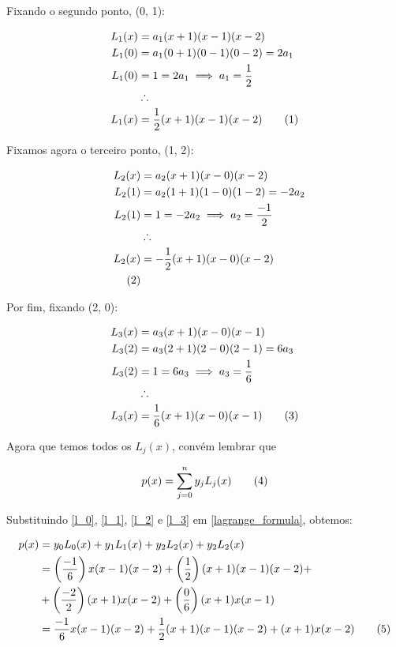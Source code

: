 \documentclass[9.5pt,reqno,a4paper]{amsart}
\newcommand\numberthis{\addtocounter{equation}{1}\tag{\theequation}}
\begin{document}
\bigskip
\bigskip
Fixando o segundo ponto, (0, 1):

\begin{align*}
    L_1(x) &= a_1(x+1)(x-1)(x-2)\\
    L_1(0) &= a_1(0+1)(0-1)(0-2) = 2a_1\\
    L_1(0) &= 1 = 2a_1 \implies a_1 = \frac{1}{2}\\
    &\therefore\\
    L_1(x) &= \frac{1}{2}(x+1)(x-1)(x-2) \numberthis \label{l_1}
\end{align*}

\bigskip
\bigskip
Fixamos agora o terceiro ponto, (1, 2):

\begin{align*}
    L_2(x) &= a_2(x+1)(x-0)(x-2)\\
    L_2(1) &= a_2(1+1)(1-0)(1-2) = -2a_2\\
    L_2(1) &= 1 = -2a_2 \implies a_2 = \frac{-1}{2}\\
    &\therefore\\
    L_2(x) &= -\frac{1}{2}(x+1)(x-0)(x-2)\\ \numberthis \label{l_2}
\end{align*}

\bigskip
\bigskip
Por fim, fixando (2, 0):

\begin{align*}
    L_3(x) &= a_3(x+1)(x-0)(x-1)\\
    L_3(2) &= a_3(2+1)(2-0)(2-1) = 6a_3\\
    L_3(2) &= 1 = 6a_3 \implies a_3 = \frac{1}{6}\\
    &\therefore\\
    L_3(x) &= \frac{1}{6}(x+1)(x-0)(x-1) \numberthis \label{l_3}
\end{align*}

\bigskip
\bigskip
Agora que temos todos os $L_j(x)$, convém lembrar que

\begin{equation}
    p(x) = \sum_{j=0}^{n} y_j L_j(x) \numberthis \label{lagrange_formula}
\end{equation}

\bigskip
\bigskip
Substituindo \eqref{l_0}, \eqref{l_1}, \eqref{l_2} e \eqref{l_3} em \eqref{lagrange_formula}, obtemos:

\begin{align*}
    p(x) &= y_0L_0(x) + y_1L_1(x) + y_2L_2(x) + y_2L_2(x)\\
         &= \left(\frac{-1}{6}\right)x(x-1)(x-2) + \left(\frac{1}{2}\right)(x+1)(x-1)(x-2) +\\
         & + \left(\frac{-2}{2}\right)(x+1)x(x-2) + \left(\frac{0}{6}\right)(x+1)x(x-1)\\
         &= \frac{-1}{6}x(x-1)(x-2) + \frac{1}{2}(x+1)(x-1)(x-2) + (x+1)x(x-2) \numberthis \label{compressed_lagrange}
\end{align*}
\end{document}
